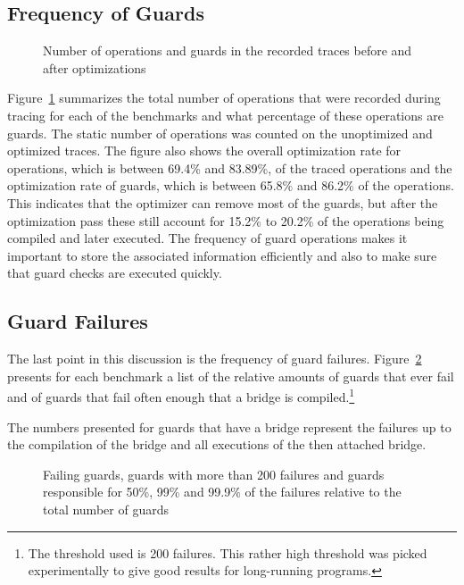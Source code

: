 \documentclass[10pt,preprint]{sigplanconf}
\begin{document}
\subsection{Frequency of Guards}
\label{sub:guard_frequency}
\begin{figure}
    
    \caption{Number of operations and guards in the recorded traces before and after optimizations}
    \label{fig:benchmarks}
\end{figure}

Figure~\ref{fig:benchmarks} summarizes the total number of operations that were
recorded during tracing for each of the benchmarks and what percentage of these
operations are guards. The static number of operations was counted on the unoptimized
and optimized traces. The figure also shows the overall optimization rate for
operations, which is between 69.4\% and 83.89\%, of the traced operations and the
optimization rate of guards, which is between 65.8\% and 86.2\% of the
operations. This indicates that the optimizer can remove
most of the guards, but after the optimization pass these still account for
15.2\% to 20.2\% of the operations being compiled and later executed.
The frequency of guard operations makes it important to store the associated
information efficiently and also to make sure that guard checks are executed
quickly.

\subsection{Guard Failures}
\label{sub:guard_failure}
The last point in this discussion is the frequency of guard failures.
Figure~\ref{fig:failing_guards} presents for each benchmark a list of the
relative amounts of guards that ever fail and of guards that fail often enough that a bridge is compiled.\footnote{
    The threshold used is 200 failures. This rather high threshold was picked experimentally to give
    good results for long-running programs.
}

The numbers presented for guards that have a bridge represent the
failures up to the compilation of the bridge and all executions of the then
attached bridge.

\begin{figure}
    
    \caption{Failing guards, guards with more than 200 failures and guards
    responsible for 50\%, 99\% and 99.9\% of the failures relative to the total number of guards}
    \label{fig:failing_guards}
\end{figure}
\end{document}
